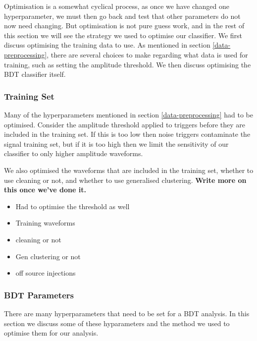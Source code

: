 \documentclass[11pt]{cuthesis}
\begin{document}
Optimisation is a somewhat cyclical process, as once we have changed one hyperparameter, we must then go back and test that other parameters do not now need changing. But optimisation is not pure guess work, and in the rest of this section we will see the strategy we used to optimise our classifier. We first discuss optimising the training data to use. As mentioned in section \ref{data-preprocessing}, there are several choices to make regarding what data is used for training, such as setting the amplitude threshold. We then discuss optimising the BDT classifier itself. 

\subsubsection{Training Set}
Many of the hyperparameters mentioned in section \ref{data-preprocessing} had to be optimised. Consider the amplitude threshold applied to triggers before they are included in the training set. If this is too low then noise triggers contaminate the signal training set, but if it is too high then we limit the sensitivity of our classifier to only higher amplitude waveforms. 

We also optimised the waveforms that are included in the training set, whether to use cleaning or not, and whether to use generalised clustering. \textbf{Write more on this once we've done it.}



\begin{itemize}
\item Had to optimise the threshold as well
\item Training waveforms
\item cleaning or not
\item Gen clustering or not
\item off source injections
\end{itemize}

\subsubsection{BDT Parameters}
There are many hyperparameters that need to be set for a BDT analysis. In this section we discuss some of these hyparameters and the method we used to optimise them for our analysis. 
\end{document}
